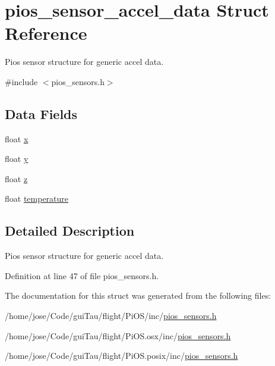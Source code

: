 \hypertarget{structpios__sensor__accel__data}{\section{pios\-\_\-sensor\-\_\-accel\-\_\-data Struct Reference}
\label{structpios__sensor__accel__data}
}


Pios sensor structure for generic accel data.  




{\ttfamily \#include $<$pios\-\_\-sensors.\-h$>$}

\subsection*{Data Fields}
\begin{DoxyCompactItemize}
\item 
float \hyperlink{group___p_i_o_s___s_e_n_s_o_r_s_gae32485cbb3023e21caf5ac1fd8378fb3}{x}
\item 
float \hyperlink{group___p_i_o_s___s_e_n_s_o_r_s_ga9f94596a8b62bafbbbd58e9196347e82}{y}
\item 
float \hyperlink{group___p_i_o_s___s_e_n_s_o_r_s_ga8d801598e8a0f5aade459361b3ec9b7a}{z}
\item 
float \hyperlink{group___p_i_o_s___s_e_n_s_o_r_s_gadb57b0d1050bd04870c0ad76832f4287}{temperature}
\end{DoxyCompactItemize}


\subsection{Detailed Description}
Pios sensor structure for generic accel data. 

Definition at line 47 of file pios\-\_\-sensors.\-h.



The documentation for this struct was generated from the following files\-:\begin{DoxyCompactItemize}
\item 
/home/jose/\-Code/gui\-Tau/flight/\-Pi\-O\-S/inc/\hyperlink{inc_2pios__sensors_8h}{pios\-\_\-sensors.\-h}\item 
/home/jose/\-Code/gui\-Tau/flight/\-Pi\-O\-S.\-osx/inc/\hyperlink{osx_2inc_2pios__sensors_8h}{pios\-\_\-sensors.\-h}\item 
/home/jose/\-Code/gui\-Tau/flight/\-Pi\-O\-S.\-posix/inc/\hyperlink{posix_2inc_2pios__sensors_8h}{pios\-\_\-sensors.\-h}\end{DoxyCompactItemize}
